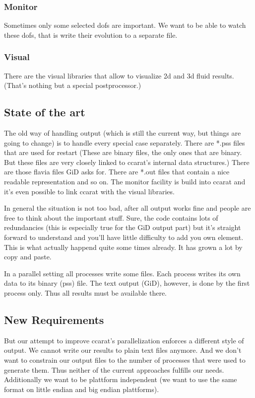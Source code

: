 \subsubsection{Monitor}

Sometimes only some selected dofs are important. We want to be able
to watch these dofs, that is write their evolution to a separate file.


\subsubsection{Visual}

There are the visual libraries that allow to visualize 2d and 3d fluid
results. (That's nothing but a special postprocessor.)


\subsection{State of the art}

The old way of handling output (which is still the current way, but
things are going to change) is to handle every special case separately.
There are {*}.pss files that are used for restart (These are binary
files, the only ones that are binary. But these files are very closely
linked to ccarat's internal data structures.) There are those flavia
files GiD asks for. There are {*}.out files that contain a nice readable
representation and so on. The monitor facility is build into ccarat
and it's even possible to link ccarat with the visual libraries.

In general the situation is not too bad, after all output works fine
and people are free to think about the important stuff. Sure, the
code contains lots of redundancies (this is especially true for the
GiD output part) but it's straight forward to understand and you'll
have little difficulty to add you own element. This is what actually
happend quite some times already. It has grown a lot by copy and paste.

In a parallel setting all processes write some files. Each process
writes its own data to its binary (pss) file. The text output (GiD),
however, is done by the first process only. Thus all results must
be available there.


\subsection{New Requirements}

But our attempt to improve ccarat's parallelization enforces a different
style of output. We cannot write our results to plain text files anymore.
And we don't want to constrain our output files to the number of processes
that were used to generate them. Thus neither of the current approaches
fulfills our needs. Additionally we want to be plattform independent
(we want to use the same format on little endian and big endian plattforms).

